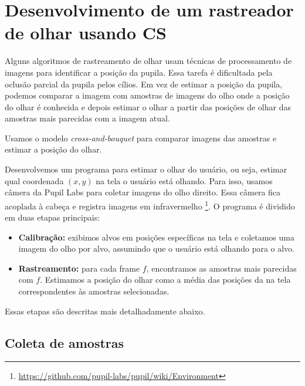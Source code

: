 \chapter{Desenvolvimento de um rastreador de olhar usando CS}

Alguns algoritmos de rastreamento de olhar usam técnicas de processamento de imagens para identificar a posição da pupila. Essa tarefa é dificultada pela oclusão parcial da pupila pelos cílios. Em vez de estimar a posição da pupila, podemos comparar a imagem com amostras de imagens do olho onde a posição do olhar é conhecida e depois estimar o olhar a partir das posições de olhar das amostras mais parecidas com a imagem atual.

Usamos o modelo \textit{cross-and-bouquet} para comparar imagens das amostras e estimar a posição do olhar.

Desenvolvemos um programa para estimar o olhar do usuário, ou seja, estimar qual coordenada $(x,y)$ na tela o usuário está olhando. Para isso, usamos câmera da Pupil Labs para coletar imagens do olho direito. Essa câmera fica acoplada à cabeça e registra imagens em infravermelho \footnote{\url{https://github.com/pupil-labs/pupil/wiki/Environment}}. O programa é dividido em duas etapas principais:

\begin{itemize}
\item {\bf Calibração:} exibimos alvos em posições específicas na tela e coletamos uma imagem do olho por alvo, assumindo que o usuário está olhando para o alvo.

\item {\bf Rastreamento:} para cada frame $f$, encontramos as amostras mais parecidas com $f$. Estimamos a posição do olhar como a média das posições da na tela correspondentes às amostras selecionadas.
\end{itemize}

Essas etapas são descritas mais detalhadamente abaixo.

\section{Coleta de amostras}


